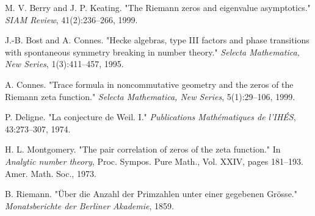 \documentclass[11pt, a4paper]{article}
\theoremstyle{definition}
\begin{document}

\begin{thebibliography}{1}

M. V. Berry and J. P. Keating.
\newblock "The Riemann zeros and eigenvalue asymptotics."
\newblock \textit{SIAM Review}, 41(2):236–266, 1999.

J.-B. Bost and A. Connes.
\newblock "Hecke algebras, type III factors and phase transitions with spontaneous symmetry breaking in number theory."
\newblock \textit{Selecta Mathematica, New Series}, 1(3):411–457, 1995.

A. Connes.
\newblock "Trace formula in noncommutative geometry and the zeros of the Riemann zeta function."
\newblock \textit{Selecta Mathematica, New Series}, 5(1):29–106, 1999.

P. Deligne.
\newblock "La conjecture de Weil. I."
\newblock \textit{Publications Mathématiques de l'IHÉS}, 43:273–307, 1974.

H. L. Montgomery.
\newblock "The pair correlation of zeros of the zeta function."
\newblock In \textit{Analytic number theory}, Proc. Sympos. Pure Math., Vol. XXIV, pages 181–193. Amer. Math. Soc., 1973.

B. Riemann.
\newblock "Über die Anzahl der Primzahlen unter einer gegebenen Grösse."
\newblock \textit{Monatsberichte der Berliner Akademie}, 1859.

\end{thebibliography}
\end{document}
